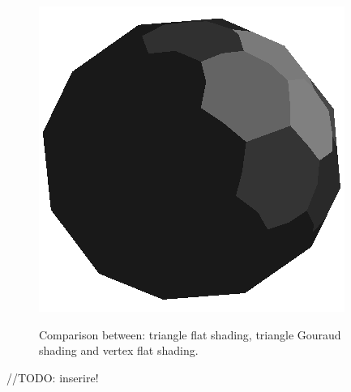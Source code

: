 \begin{figure}[!h]
    \label{fig:gouraud-shading}
    \endminipage\hfill
    \centering
    \includegraphics[scale=0.5]{images/extentflatshading.png}\label{fig:flat-shading-vertex}
    \endminipage
    \caption{Comparison between: triangle flat shading, triangle Gouraud shading and vertex flat shading.}
    \label{fig:comparison-icosahedron}
\end{figure}

//TODO: inserire!

